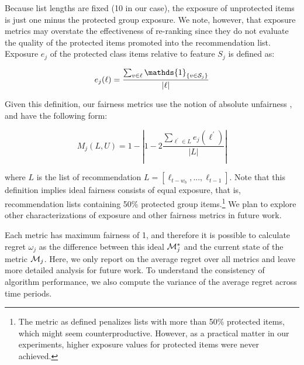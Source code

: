 
Because list lengths are fixed (10 in our case), the exposure of unprotected items is just one minus the protected group exposure. We note, however, that exposure metrics may overstate the effectiveness of re-ranking since they do not evaluate the quality of the protected items promoted into the recommendation list. Exposure $e_j$ of the protected class items relative to feature $S_j$ is defined as:

\begin{equation}
    e_j(\ell) = \frac{\sum_{v \in \ell}{\mathds{1}_{\{v \in \sensitive_j\}}}}{|\ell|}
\end{equation}
\vspace{0.25cm}

Given this definition, our fairness metrics use the notion of absolute unfairness \cite{yao2017beyond}, and have the following form:

\begin{equation}
    M_j(L, U) = 1 - | 1 - 2 \frac{\sum_{\ell^{\prime} \in L}{e_j(\ell^{\prime})}}{|L|} |
\end{equation}
\vspace{0.25cm}

where $L$ is the list of recommendation $L = [\ell_{t-w_b},...,\ell_{t-1}] $. Note that this definition implies ideal fairness consists of equal exposure, that is, recommendation lists containing 50\% protected group items.\footnote{The metric as defined penalizes lists with more than 50\% protected items, which might seem counterproductive. However, as a practical matter in our experiments, higher exposure values for protected items were never achieved.} We plan to explore other characterizations of exposure and other fairness metrics in future work. 

Each metric has maximum fairness of 1, and therefore it is possible to calculate regret $\omega_j$ as the difference between this ideal $\mathcal{M}_j^*$ and the current state of the metric $\mathcal{M}_j$. Here, we only report on the average regret over all metrics and leave more detailed analysis for future work. To understand the consistency of algorithm performance, we also compute the variance of the average regret across time periods.

